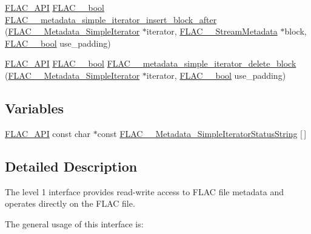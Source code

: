 \begin{DoxyCompactItemize}
\item 
\mbox{\hyperlink{group__flac__export_ga56ca07df8a23310707732b1c0007d6f5}{F\+L\+A\+C\+\_\+\+A\+PI}} \mbox{\hyperlink{ordinals_8h_a95103469f1cbd78b8cf250194985b34e}{F\+L\+A\+C\+\_\+\+\_\+bool}} \mbox{\hyperlink{group__flac__metadata__level1_ga1239ccc5ae1dc3f7cb0e1a61707fafc6}{F\+L\+A\+C\+\_\+\+\_\+metadata\+\_\+simple\+\_\+iterator\+\_\+insert\+\_\+block\+\_\+after}} (\mbox{\hyperlink{group__flac__metadata__level1_ga6accccddbb867dfc2eece9ee3ffecb3a}{F\+L\+A\+C\+\_\+\+\_\+\+Metadata\+\_\+\+Simple\+Iterator}} $\ast$iterator, \mbox{\hyperlink{struct_f_l_a_c_____stream_metadata}{F\+L\+A\+C\+\_\+\+\_\+\+Stream\+Metadata}} $\ast$block, \mbox{\hyperlink{ordinals_8h_a95103469f1cbd78b8cf250194985b34e}{F\+L\+A\+C\+\_\+\+\_\+bool}} use\+\_\+padding)
\item 
\mbox{\hyperlink{group__flac__export_ga56ca07df8a23310707732b1c0007d6f5}{F\+L\+A\+C\+\_\+\+A\+PI}} \mbox{\hyperlink{ordinals_8h_a95103469f1cbd78b8cf250194985b34e}{F\+L\+A\+C\+\_\+\+\_\+bool}} \mbox{\hyperlink{group__flac__metadata__level1_gaf0a1823f95f8097f0d2ff3f67ae30a88}{F\+L\+A\+C\+\_\+\+\_\+metadata\+\_\+simple\+\_\+iterator\+\_\+delete\+\_\+block}} (\mbox{\hyperlink{group__flac__metadata__level1_ga6accccddbb867dfc2eece9ee3ffecb3a}{F\+L\+A\+C\+\_\+\+\_\+\+Metadata\+\_\+\+Simple\+Iterator}} $\ast$iterator, \mbox{\hyperlink{ordinals_8h_a95103469f1cbd78b8cf250194985b34e}{F\+L\+A\+C\+\_\+\+\_\+bool}} use\+\_\+padding)
\end{DoxyCompactItemize}
\subsection*{Variables}
\begin{DoxyCompactItemize}
\item 
\mbox{\hyperlink{group__flac__export_ga56ca07df8a23310707732b1c0007d6f5}{F\+L\+A\+C\+\_\+\+A\+PI}} const char $\ast$const \mbox{\hyperlink{group__flac__metadata__level1_ga28ea4a13fcbe97a732fafb13417036bb}{F\+L\+A\+C\+\_\+\+\_\+\+Metadata\+\_\+\+Simple\+Iterator\+Status\+String}} \mbox{[}$\,$\mbox{]}
\end{DoxyCompactItemize}


\subsection{Detailed Description}
The level 1 interface provides read-\/write access to F\+L\+AC file metadata and operates directly on the F\+L\+AC file. 

The general usage of this interface is\+:


